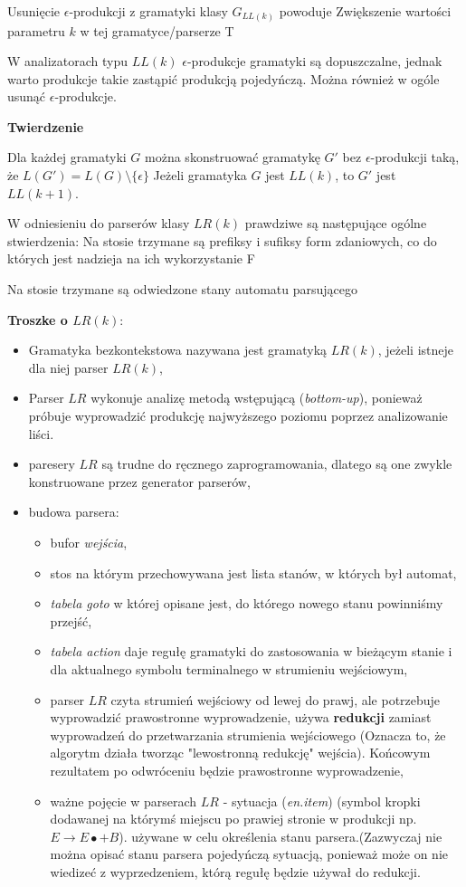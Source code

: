 \answer
{Usunięcie $\epsilon$-produkcji z gramatyki klasy $G_{LL(k)}$ powoduje}
{Zwiększenie wartości parametru $k$ w tej gramatyce/parserze}
{T}
{W analizatorach typu $LL(k)$ $\epsilon$-produkcje gramatyki są dopuszczalne, jednak warto produkcje takie zastąpić produkcją pojedyńczą. Można również w ogóle usunąć $\epsilon$-produkcje.

}
{\textbf{Twierdzenie}

Dla każdej gramatyki $G$ można skonstruować gramatykę $G'$ bez $\epsilon$-produkcji taką, że $L(G') = L(G)\setminus \{ \epsilon \}$
Jeżeli gramatyka $G$ jest $LL(k)$, to $G'$ jest $LL(k+1)$. }

\answer
{W odniesieniu do parserów klasy $LR(k)$ prawdziwe są następujące ogólne stwierdzenia:}
{Na stosie trzymane są prefiksy i sufiksy form zdaniowych, co do których jest nadzieja na ich wykorzystanie}
{F}
{Na stosie trzymane są odwiedzone stany automatu parsującego

\textbf{Troszke o $LR(k)$}:
\begin{itemize}
\item Gramatyka bezkontekstowa nazywana jest gramatyką $LR(k)$, jeżeli istneje dla niej parser $LR(k)$,
\item Parser $LR$ wykonuje analizę metodą wstępującą (\textit{bottom-up}), ponieważ próbuje wyprowadzić produkcję najwyższego poziomu poprzez analizowanie liści.
\item paresery $LR$ są trudne do ręcznego zaprogramowania, dlatego są one zwykle konstruowane przez generator parserów,
\item budowa parsera:
    \begin{itemize}
    \item bufor \textit{wejścia},
    \item stos na którym przechowywana jest lista stanów, w których był automat,
    \item \textit{tabela goto} w której opisane jest, do którego nowego stanu powinniśmy przejść,
    \item \textit{tabela action} daje regułę gramatyki do zastosowania w bieżącym stanie i dla aktualnego symbolu terminalnego w strumieniu wejściowym,
    \item parser $LR$ czyta strumień wejściowy od lewej do prawj, ale potrzebuje wyprowadzić prawostronne wyprowadzenie, używa \textbf{redukcji} zamiast wyprowadzeń do przetwarzania strumienia wejściowego (Oznacza to, że algorytm działa tworząc "lewostronną redukcję" wejścia). Końcowym rezultatem po odwróceniu będzie prawostronne wyprowadzenie,
    \item ważne pojęcie w parserach $LR$ - sytuacja (\textit{en.item}) (symbol kropki dodawanej na którymś miejscu po prawiej stronie w produkcji np. $E \rightarrow E\bullet + B$). używane w celu określenia stanu parsera.(Zazwyczaj nie można opisać stanu parsera pojedyńczą sytuacją, ponieważ może on nie wiedizeć z wyprzedzeniem, którą regułę będzie używał do redukcji.
    \end{itemize}
\end{itemize}}
{}

